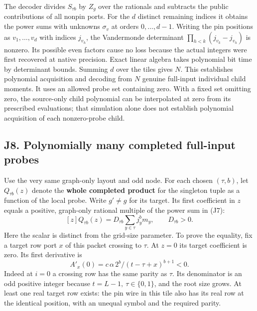 \documentclass[
  11pt,
]{article}
\begin{document}
The decoder divides \(S_{\tau b}\) by \(Z_g\) over the rationals and
subtracts the public contributions of all nonpin ports. For the \(d\)
distinct remaining indices it obtains the power sums with unknowns
\(\sigma_v\) at orders \(0,\ldots,d-1\). Writing the pin positions as
\(v_1,\ldots,v_d\) with indices \(j_{v_h}\), the Vandermonde determinant
\(\prod_{h<k}(j_{v_k}-j_{v_h})\) is nonzero. Its possible even factors
cause no loss because the actual integers were first recovered at native
precision. Exact linear algebra takes polynomial bit time by determinant
bounds. Summing \(d\) over the tiles gives \(N\). This establishes
polynomial acquisition and decoding from \(N\) genuine full-input
individual child moments. It uses an allowed probe set containing zero.
With a fixed set omitting zero, the source-only child polynomial can be
interpolated at zero from its prescribed evaluations; that simulation
alone does not establish polynomial acquisition of each nonzero-probe
child.

\subsection{J8. Polynomially many completed full-input
probes}\label{v9-j8-polynomially-many-completed-full-input-probes}

Use the very same graph-only layout and odd node. For each chosen
\((\tau,b)\), let \(Q_{\tau b}(z)\) denote the \textbf{whole completed
product} for the singleton tuple as a function of the local probe. Write
\(g'\ne g\) for its target. Its first coefficient in \(z\) equals a
positive, graph-only rational multiple of the power sum in (J7): \[
             [z]Q_{\tau b}(z)=D_{\tau b}\sum_{y\in\tau} j_y^b m_y,
             \qquad D_{\tau b}>0 .                                     \tag{J8}
\] Here the scalar is distinct from the grid-size parameter. To prove
the equality, fix a target row port \(x\) of this packet crossing to
\(\tau\). At \(z=0\) its target coefficient is zero. Its first
derivative is \[
          A'_x(0)=c\,\alpha\, 2^b/(t-\tau+x)^{b+1}<0.
\] Indeed at \(i=0\) a crossing row has the same parity as \(\tau\). Its
denominator is an odd positive integer because
\(t=L-1,\ \tau\in\{0,1\}\), and the root size grows. At least one real
target row exists: the pin wire in this tile also has its real row at
the identical position, with an unequal symbol and the required parity.
\end{document}
